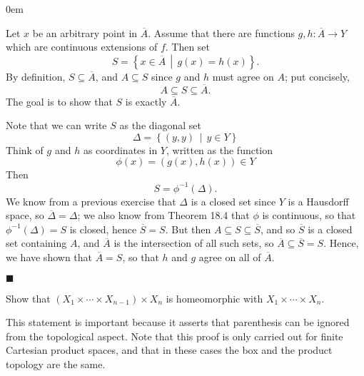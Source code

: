 \documentclass[12pt]{article}
\renewcommand{\qed}{\hfill$\blacksquare$}
\renewenvironment{proof}{\begin{addmargin}[1em]{0em}\begin{newproof}}{\end{newproof}\end{addmargin}\qed}
\newenvironment{problem}[2][Exercise]{\begin{trivlist}
\item[\hskip \labelsep {\bfseries #1}\hskip \labelsep {\bfseries #2.}]}{\end{trivlist}}
\begin{document}
\begin{proof}
	Let $x$ be an arbitrary point in $\overline{A}$. Assume that there are functions $g,h:\overline{A}\rightarrow Y$ which are continuous extensions of $f$. Then set $$ S = \left\{ x\in \overline{A} \, \middle| \, g\left(x\right)=h\left(x\right) \right\}. $$ By definition, $S \subseteq \overline{A}$, and $A \subseteq S$ since $g$ and $h$ must agree on $A$; put concisely, $$ A \subseteq S \subseteq \overline{A}.$$ The goal is to show that $S$ is exactly $\overline{A}$.
	
	Note that we can write $S$ as the diagonal set $$ \Delta = \left\{ \left(y,y\right) \, \middle| \, y \in Y\right\}$$ Think of $g$ and $h$ as coordinates in $Y$, written as the function $$ \phi\left(x\right) = \left(g\left(x\right),h\left(x\right)\right) \in Y $$ Then $$ S = \phi^{-1}\left(\Delta\right).$$ We know from a previous exercise that $\Delta$ is a closed set since $Y$ is a Hausdorff space, so $\overline{\Delta}=\Delta$; we also know from Theorem 18.4 that $\phi$ is continuous, so that $\phi^{-1}\left(\Delta\right)=S$ is closed, hence $\overline{S}=S$. But then $A \subseteq S \subseteq \overline{S}$, and so $\overline{S}$ is a closed set containing $A$, and $\overline{A}$ is the intersection of all such sets, so $\overline{A}\subseteq \overline{S}=S$. Hence, we have shown that $\overline{A}=S$, so that $h$ and $g$ agree on all of $\overline{A}$.
\end{proof}






\begin{problem}{19.4}
	Show that $\left(X_1\times \cdots \times X_{n-1}\right) \times X_n$ is homeomorphic with $X_1 \times \cdots \times X_n$.
\end{problem}
{\color{red}This statement is important because it asserts that parenthesis can be ignored from the topological aspect. Note that this proof is only carried out for finite Cartesian product spaces, and that in these cases the box and the product topology are the same.}\\
\end{document}
